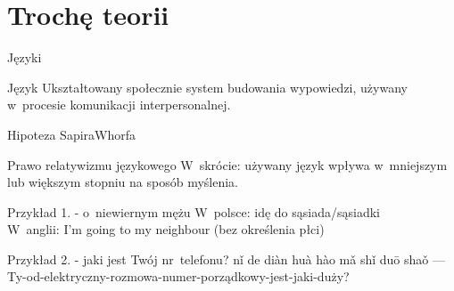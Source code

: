 \documentclass{beamer}
\begin{document}
\section{Trochę teorii}

\begin{frame}{Języki}
	\begin{block}{Język}
		Ukształtowany społecznie system budowania wypowiedzi, używany w~procesie komunikacji
		interpersonalnej.
	\end{block}
\end{frame}

\begin{frame}{Hipoteza Sapira\dywiz Whorfa}
 	\begin{alertblock}{Prawo relatywizmu językowego}
		W~skrócie: używany język wpływa w~mniejszym lub większym
		stopniu na sposób myślenia.
	\end{alertblock}
	\pause
	\begin{block}{Przykład 1. - o~niewiernym mężu}
		W~polsce: idę do sąsiada/sąsiadki\\
		W~anglii: I'm going to my neighbour (bez określenia płci)
	\end{block}
	\pause
	\begin{block}{Przykład 2. - jaki jest Twój nr~telefonu?}
		n\v i de di\`an hu\`a h\`ao m\v a sh\v i du\=o sha\v o --- Ty-od-elektryczny-rozmowa-numer-porządkowy-jest-jaki-duży?
	\end{block}
\end{frame}
\end{document}
